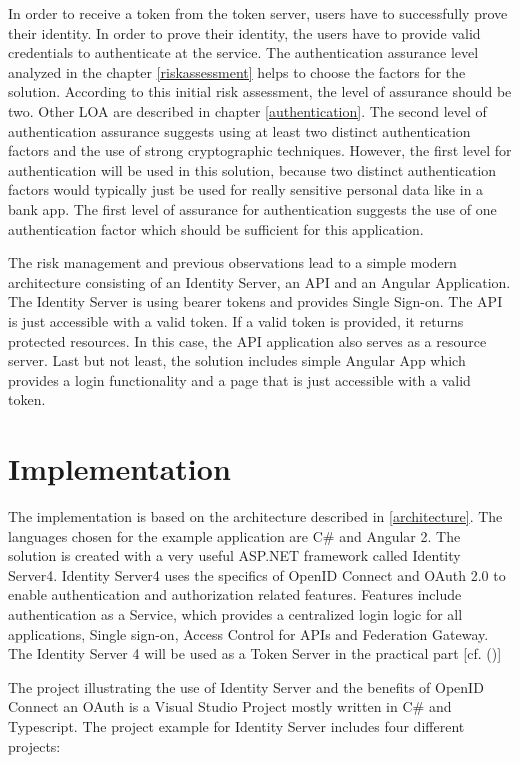   In order to receive a token from the token server, users have to successfully prove their identity. In order to prove their identity, the users have to provide valid credentials to authenticate at the service. The authentication assurance level analyzed in the chapter \ref{riskassessment} helps to choose the factors for the solution. According to this initial risk assessment, the level of assurance should be two. Other LOA are described in chapter \ref{authentication}. The second level of authentication assurance suggests using at least two distinct authentication factors and the use of strong cryptographic techniques. However, the first level for authentication will be used in this solution, because two distinct authentication factors would typically just be used for really sensitive personal data like in a bank app. The first level of assurance for authentication suggests the use of one authentication factor which should be sufficient for this application.
 
 The risk management and previous observations lead to a simple modern architecture consisting of an Identity Server, an API and an Angular Application. The Identity Server is using bearer tokens and provides Single Sign-on. The API is just accessible with a valid token. If a valid token is provided, it returns protected resources. In this case, the API application also serves as a resource server. Last but not least, the solution includes simple Angular App which provides a login functionality and a page that is just accessible with a valid token.
 

\section{Implementation}

The implementation is based on the architecture described in \ref{architecture}. The languages chosen for the example application are C\# and Angular 2. The solution is created with a very useful ASP.NET framework called Identity Server4. Identity Server4 uses the specifics of OpenID Connect and OAuth 2.0 to enable authentication and authorization related features. Features include authentication as a Service, which provides a centralized login logic for all applications, Single sign-on, Access Control for APIs and Federation Gateway. The Identity Server 4 will be used as a Token Server in the practical part [cf. (\cite{Brock:2018:ID4})]

The project illustrating the use of Identity Server and the benefits of OpenID Connect an OAuth is a Visual Studio Project mostly written in C\# and Typescript. The project example for Identity Server includes four different projects:

